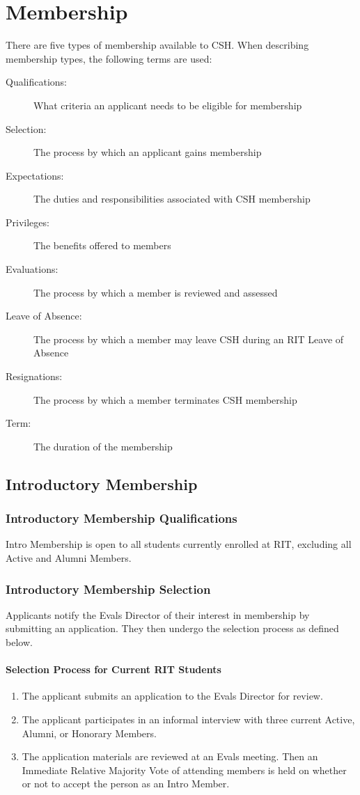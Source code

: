 \documentclass{article}
\newcommand{\article}[1]{\section{#1} \label{#1}}
\newcommand{\asection}[1]{\subsection{#1} \label{#1}}
\newcommand{\asubsection}[1]{\subsubsection{#1} \label{#1}}
\newcommand{\asubsubsection}[1]{\paragraph{#1} \label{#1}}
\begin{document}
\article{Membership}
There are five types of membership available to CSH.
When describing membership types, the following terms are used:
\begin{description}
	\item[Qualifications:] What criteria an applicant needs to be eligible for membership
	\item[Selection:] The process by which an applicant gains membership
	\item[Expectations:] The duties and responsibilities associated with CSH membership
	\item[Privileges:] The benefits offered to members
	\item[Evaluations:] The process by which a member is reviewed and assessed
	\item[Leave of Absence:] The process by which a member may leave CSH during an RIT Leave of Absence
	\item[Resignations:] The process by which a member terminates CSH membership
	\item[Term:] The duration of the membership
\end{description}

\asection{Introductory Membership}

\asubsection{Introductory Membership Qualifications}
Intro Membership is open to all students currently enrolled at RIT, excluding all Active and Alumni Members.

\asubsection{Introductory Membership Selection}
Applicants notify the Evals Director of their interest in membership by submitting an application.
They then undergo the selection process as defined below.

\asubsubsection{Selection Process for Current RIT Students}
\renewcommand{\theenumi}{\arabic{enumi}} %
\begin{enumerate}
	\item The applicant submits an application to the Evals Director for review.
	\item The applicant participates in an informal interview with three current Active, Alumni, or Honorary Members.
	\item The application materials are reviewed at an Evals meeting.
	      Then an Immediate Relative Majority Vote of attending members is held on whether or not to accept the person as an Intro Member.
\end{enumerate}
\end{document}
